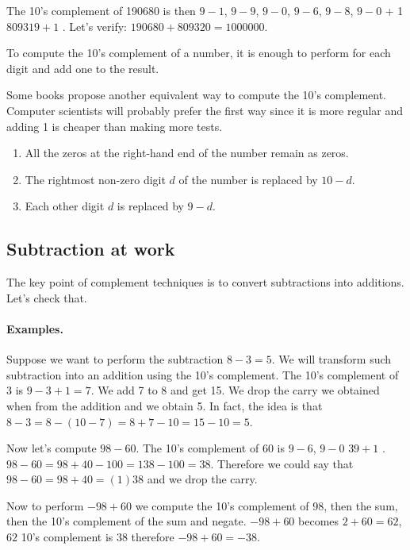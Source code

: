 \documentclass[a4paper,10pt,twoside]{book}
\begin{document}
The 10's complement of 190680 is then $9-1$, $9-9$, $9-0$, $9-6$, $9-8$, $9-0$ + 1 \ie $809319 + 1$ . Let's verify: $190680 + 809320 = 1000000$.
 
To compute the 10's complement of a number, it is enough to perform  for each digit and add one to the result.


Some books propose another equivalent way to compute the 10's complement. Computer scientists will probably prefer the first way since it is more regular and adding 1 is cheaper than making more tests.
\begin{enumerate}
\item All the zeros at the right-hand end of the number remain as zeros. 
\item The rightmost non-zero digit $d$ of the number is replaced by $10 - d$. 
\item Each other digit $d$ is replaced by $9 - d$. 
\end{enumerate}




\subsection{Subtraction at work}
The key point of complement techniques is to convert subtractions into additions. Let's check that.

\paragraph{Examples.}
Suppose we want to perform the subtraction $8 - 3 = 5$. We will transform such subtraction into an addition using the 10's complement. The 10's complement of 3 is $9 - 3 + 1 = 7$. We add 7 to 8 and get 15. 
We drop the carry we obtained when from the addition and we obtain 5. In fact, the idea is that $8-3=8-(10-7)=8+7-10=15-10=5$.


Now let's compute $98-60$. The 10's complement of 60 is $9-6$, $9-0$ \ie $39 + 1$ . $98-60 = 98 + 40 - 100 = 138 - 100 = 38$. 
Therefore we could say that $98-60=98+40=(1)38$ and we drop the carry. 

Now to perform $-98+60$ we compute the 10's complement of 98, then the sum, then the 10's complement of the sum and negate. \ie$-98+60$ becomes $2+60=62$, $62$ 10's complement is 38 therefore $-98+60=-38$.
\end{document}
